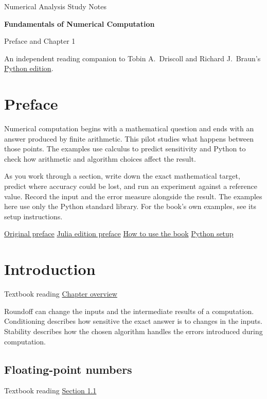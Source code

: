 \documentclass[11pt,letterpaper]{article}
\newcommand{\reading}[2]{\par\smallskip
  {\small Textbook reading \enspace\href{#1}{#2}}\par\medskip}
\begin{document}
{\color{accent}\large Numerical Analysis Study Notes\par}
\vspace{0.45em}
{\LARGE\bfseries Fundamentals of Numerical Computation\par}
\smallskip
{\large Preface and Chapter 1\par}
\vspace{1em}
An independent reading companion to Tobin A.\ Driscoll and Richard J.\
Braun's \href{https://fncbook.com/python/}{Python edition}.

\section*{Preface}
Numerical computation begins with a mathematical question and ends with an
answer produced by finite arithmetic. This pilot studies what happens
between those points. The examples use calculus to predict sensitivity and
Python to check how arithmetic and algorithm choices affect the result.

As you work through a section, write down the exact mathematical target,
predict where accuracy could be lost, and run an experiment against a
reference value. Record the input and the error measure alongside the
result. The examples here use only the Python standard library. For the
book's own examples, see its setup instructions.

{\small
  \href{https://fncbook.com/python/preface-original/}{Original preface}
  \enspace\textbullet\enspace
  \href{https://fncbook.com/python/preface/}{Julia edition preface}
  \enspace\textbullet\enspace
  \href{https://fncbook.com/python/usage/}{How to use the book}
  \enspace\textbullet\enspace
  \href{https://fncbook.com/python/setup/}{Python setup}\par
}

\tableofcontents

\clearpage
\section{Introduction}
\reading{https://fncbook.com/python/overview/}{Chapter overview}

Roundoff can change the inputs and the intermediate results of a computation.
Conditioning describes how sensitive the exact answer is to changes in the
inputs. Stability describes how the chosen algorithm handles the errors
introduced during computation.

\subsection{Floating-point numbers}
\reading{https://fncbook.com/python/floating-point/}{Section 1.1}
\end{document}
